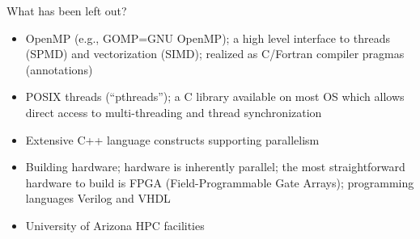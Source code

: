 \documentclass[pdflatex,colorlinks,landscape]{beamer}
\renewcommand\emph[1]{{\color{magenta}#1}}
\begin{document}
\begin{frame}{What has been left out?}
  \begin{itemize}
  \item \emph{OpenMP} (e.g., GOMP=GNU OpenMP); a high
    level interface to threads (SPMD) and
    vectorization (SIMD); realized as C/Fortran compiler
    \emph{pragmas} (annotations)
  \item \emph{POSIX threads} (``pthreads''); a C library available on most OS
    which allows direct access to multi-threading and
    thread synchronization
  \item Extensive \emph{C++ language} constructs supporting parallelism
  \item \emph{Building hardware}; hardware is inherently parallel;
    the most straightforward hardware to build is FPGA (Field-Programmable Gate Arrays);
    programming languages \emph{Verilog} and \emph{VHDL}
  \item University of Arizona \emph{HPC facilities}
  \end{itemize}
\end{frame}
\end{document}

